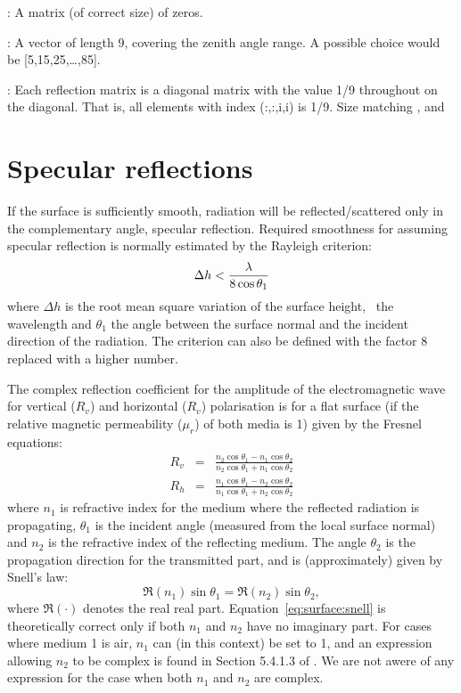  : A matrix (of correct size) of zeros.

 : A vector of length 9, covering the zenith
 angle range. A possible choice would be [5,15,25,\dots,85].

 : Each reflection matrix is a diagonal
 matrix with the value 1/9 throughout on the diagonal. That is, all
 elements with index (:,:,i,i) is 1/9. Size matching
 ,  and



\section{Specular reflections}
 \label{sec:surface:surface:specular}
 
 If the surface is sufficiently smooth, radiation will be
 reflected/scattered only in the complementary angle, specular
 reflection. Required smoothness for assuming specular reflection is
 normally estimated by the Rayleigh criterion:
 \begin{equation}
   \label{eq:surface:rayleigh}
   \Delta h < \frac{\lambda}{8\cos\theta_1}
 \end{equation}
 where $\Delta h$ is the root mean square variation of the surface
 height, \Wvl\ the wavelength and $\theta_1$ the angle between the
 surface normal and the incident direction of the radiation. The
 criterion can also be defined with the factor 8 replaced with a 
 higher number.
 
 The complex reflection coefficient for the amplitude of the
 electromagnetic wave for vertical ($R_v$) and horizontal ($R_v$)
 polarisation is for a flat surface (if the relative magnetic
 permeability ($\mu_r$) of both media is 1) given by the Fresnel equations:
 \begin{eqnarray}
   \label{eq:surface_fresnel}
   R_v &=& \frac{n_2\cos\theta_1-n_1\cos\theta_2}
                                           {n_2\cos\theta_1+n_1\cos\theta_2} \\
   R_h &=& \frac{n_1\cos\theta_1-n_2\cos\theta_2}
                                           {n_1\cos\theta_1+n_2\cos\theta_2} 
 \end{eqnarray}
 where $n_1$ is refractive index for the medium where the reflected radiation
 is propagating, $\theta_1$ is the incident angle (measured from the local
 surface normal) and $n_2$ is the refractive index of the reflecting medium.
 The angle $\theta_2$ is the propagation direction for the transmitted part,
 and is (approximately) given by Snell's law:
 \begin{equation}
   \label{eq:surface:snell}
   \Re(n_1)\sin\theta_1 = \Re(n_2)\sin\theta_2,
 \end{equation}
 where $\Re(\cdot)$ denotes the real real part. Equation~\ref{eq:surface:snell}
 is theoretically correct only if both $n_1$ and $n_2$ have no imaginary part. 
 For cases where medium 1 is air, $n_1$ can (in this context) be set to 1, and 
an expression allowing $n_2$ to be complex is found in Section 5.4.1.3 of
\citet{liou:02}. We are not awere of any expression for the case when both
$n_1$ and $n_2$ are complex.

